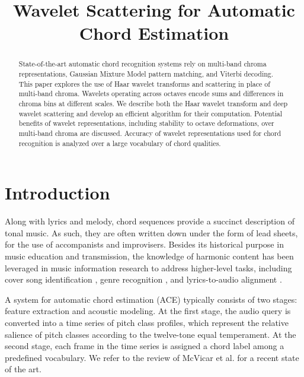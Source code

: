 \documentclass{article}
\title{Wavelet Scattering for Automatic Chord Estimation}
\makeatletter
\newcommand*{\etal}{et al.\@\xspace}
\makeatother
\begin{document}
%
\maketitle
%
\begin{abstract}
State-of-the-art automatic chord recognition systems rely on multi-band chroma representations,
Gaussian Mixture Model pattern matching, and Viterbi decoding.
This paper explores the use of Haar wavelet transforms and scattering in place of multi-band
chroma. Wavelets operating across octaves encode sums and differences in chroma bins at
different scales.
We describe both the Haar wavelet transform and deep wavelet scattering and develop an
efficient algorithm for their computation. Potential benefits of wavelet representations,
including stability to octave deformations, over multi-band chroma are discussed.
Accuracy of wavelet representations used for chord recognition is analyzed over a large
vocabulary of chord qualities.
\end{abstract}


\section{Introduction}\label{sec:introduction}
Along with lyrics and melody, chord sequences provide a succinct description of tonal music.
As such, they are often written down under the form of lead sheets, for the use of
accompanists and improvisers.
Besides its historical purpose in music education and transmission, the knowledge of
harmonic content has been leveraged in music information research to address higher-level
tasks, including cover song identification \cite{ellis2007identifying},
genre recognition \cite{perez2009genre}, and lyrics-to-audio alignment
\cite{mauch2012integrating}.

A system for automatic chord estimation (ACE) typically consists of two stages:
feature extraction and acoustic modeling.
At the first stage, the audio query is converted into a time series of
pitch class profiles, which represent the relative salience of
pitch classes according to the twelve-tone equal temperament.
At the second stage, each frame in the time series is assigned
a chord label among a predefined vocabulary.
We refer to the review of McVicar \etal \cite{mcvicar2014automatic} for a
recent state of the art.
\end{document}
